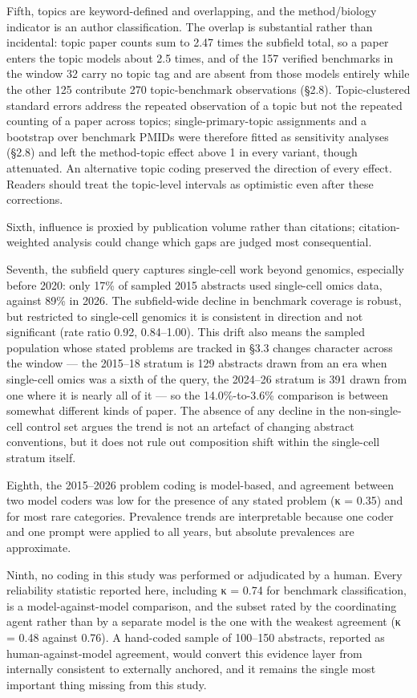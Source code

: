 \documentclass[11pt]{article}
\begin{document}
Fifth, topics are keyword-defined and overlapping, and the
method/biology indicator is an author classification. The overlap is
substantial rather than incidental: topic paper counts sum to 2.47 times
the subfield total, so a paper enters the topic models about 2.5 times,
and of the 157 verified benchmarks in the window 32 carry no topic tag
and are absent from those models entirely while the other 125 contribute
270 topic-benchmark observations (§2.8). Topic-clustered standard errors
address the repeated observation of a topic but not the repeated
counting of a paper across topics; single-primary-topic assignments and
a bootstrap over benchmark PMIDs were therefore fitted as sensitivity
analyses (§2.8) and left the method-topic effect above 1 in every
variant, though attenuated. An alternative topic coding preserved the
direction of every effect. Readers should treat the topic-level
intervals as optimistic even after these corrections.

Sixth, influence is proxied by publication volume rather than citations;
citation-weighted analysis could change which gaps are judged most
consequential.

Seventh, the subfield query captures single-cell work beyond genomics,
especially before 2020: only 17\% of sampled 2015 abstracts used
single-cell omics data, against 89\% in 2026. The subfield-wide decline
in benchmark coverage is robust, but restricted to single-cell genomics
it is consistent in direction and not significant (rate ratio 0.92,
0.84--1.00). This drift also means the sampled population whose stated
problems are tracked in §3.3 changes character across the window --- the
2015--18 stratum is 129 abstracts drawn from an era when single-cell
omics was a sixth of the query, the 2024--26 stratum is 391 drawn from
one where it is nearly all of it --- so the 14.0\%-to-3.6\% comparison
is between somewhat different kinds of paper. The absence of any decline
in the non-single-cell control set argues the trend is not an artefact
of changing abstract conventions, but it does not rule out composition
shift within the single-cell stratum itself.

Eighth, the 2015--2026 problem coding is model-based, and agreement
between two model coders was low for the presence of any stated problem
(κ = 0.35) and for most rare categories. Prevalence trends are
interpretable because one coder and one prompt were applied to all
years, but absolute prevalences are approximate.

Ninth, no coding in this study was performed or adjudicated by a human.
Every reliability statistic reported here, including κ = 0.74 for
benchmark classification, is a model-against-model comparison, and the
subset rated by the coordinating agent rather than by a separate model
is the one with the weakest agreement (κ = 0.48 against 0.76). A
hand-coded sample of 100--150 abstracts, reported as human-against-model
agreement, would convert this evidence layer from internally consistent
to externally anchored, and it remains the single most important thing
missing from this study.
\end{document}
